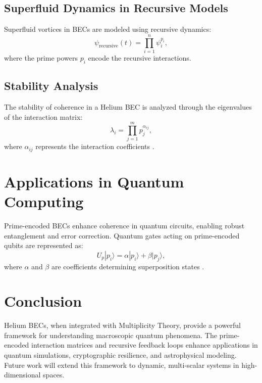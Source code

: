 \documentclass{article}
\theoremstyle{plain}
\begin{document}
\subsection{Superfluid Dynamics in Recursive Models}
Superfluid vortices in BECs are modeled using recursive dynamics:
\begin{equation}
\psi_{\text{recursive}}(t) = \prod_{i=1}^n \psi^{p_i}_i,
\end{equation}
where the prime powers $p_i$ encode the recursive interactions.

\subsection{Stability Analysis}
The stability of coherence in a Helium BEC is analyzed through the eigenvalues of the interaction matrix:
\begin{equation}
\lambda_i = \prod_{j=1}^m p_j^{\alpha_{ij}},
\end{equation}
where $\alpha_{ij}$ represents the interaction coefficients \cite{pethick2008}.

\section{Applications in Quantum Computing}
Prime-encoded BECs enhance coherence in quantum circuits, enabling robust entanglement and error correction. Quantum gates acting on prime-encoded qubits are represented as:
\begin{equation}
U_p |p_i\rangle = \alpha |p_i\rangle + \beta |p_j\rangle,
\end{equation}
where $\alpha$ and $\beta$ are coefficients determining superposition states \cite{cornell2002}.

\section{Conclusion}
Helium BECs, when integrated with Multiplicity Theory, provide a powerful framework for understanding macroscopic quantum phenomena. The prime-encoded interaction matrices and recursive feedback loops enhance applications in quantum simulations, cryptographic resilience, and astrophysical modeling. Future work will extend this framework to dynamic, multi-scalar systems in high-dimensional spaces.



\end{document}
